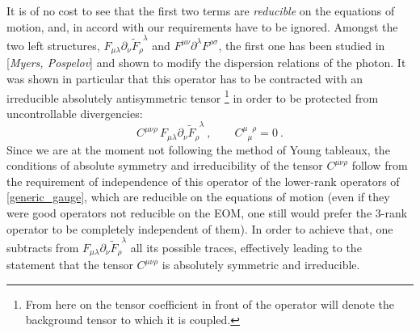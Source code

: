 \documentclass[12pt]{revtex4}
\newcommand{\p}{\partial}
\newcommand{\wt}{\widetilde}
\begin{document}
	It is of no cost to see that the first two terms are {\it reducible}
	on the equations of motion, and, in accord with our requirements
	have to be ignored. 
	Amongst the two left structures, 
$ F_{\mu\lambda} \p_\nu \widetilde{F}_\rho^{\phantom{\rho}\lambda} $ and
$ F^{\mu\nu} \partial^\lambda F^{\rho\sigma} $,
	the first one has been studied in [{\it Myers, Pospelov}] and
	shown to modify the dispersion relations of the photon. 
	It was shown in particular that this operator has to be 
	contracted with an
	irreducible absolutely antisymmetric tensor
	\footnote{
	From here on the tensor coefficient in front of the operator
	will denote the background tensor to which it is coupled.}
	in order to be protected from uncontrollable divergencies:
\begin{equation}
\label{QED_gauge}
	C^{\mu\nu\rho}\, F_{\mu\lambda} \p_\nu 
	\wt{F}_\rho^{\phantom{\rho}\lambda}~,
	\qquad C^{\mu\phantom{\mu}\rho}_{\phantom{\mu}\mu} = 0~.
\end{equation}
	Since we are at the moment not following the method of Young tableaux,
	the conditions of absolute symmetry and irreducibility of
	the tensor $ C^{\mu\nu\rho} $ follow from the requirement of
	independence of this operator of the lower-rank operators
	of \eqref{generic_gauge}, which are reducible on the equations
	of motion
	(even if they were good operators not reducible on the EOM, 
	one still would prefer the 3-rank operator to be completely independent
	of them).
	In order to achieve that, one subtracts from 
$ F_{\mu\lambda} \p_\nu \wt{F}_\rho^{\phantom{\rho}\lambda} $
	all its possible traces, effectively leading to the statement
	that the tensor $ C^{\mu\nu\rho} $ is absolutely symmetric
	and irreducible.
\end{document}

